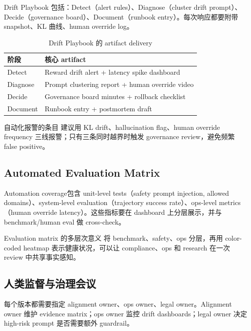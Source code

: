 \documentclass[a4paper]{article}
\begin{document}
Drift Playbook 包括：Detect（alert rules）、Diagnose（cluster drift prompt）、Decide（governance board）、Document（runbook entry）。每次响应都要附带 snapshot、KL 曲线、human override log。

\begin{table}[H]
\centering
\begin{tabular}{p{} p{}}
\toprule
阶段 & 核心 artifact \\
\midrule
Detect & Reward drift alert + latency spike dashboard \\
Diagnose & Prompt clustering report + human override video \\
Decide & Governance board minutes + rollback checklist \\
Document & Runbook entry + postmortem draft \\
\bottomrule
\end{tabular}
\caption{Drift Playbook 的 artifact delivery}
\end{table}

\begin{knowledgebox}{自动化报警的条目}
建议用 KL drift、hallucination flag、human override frequency 三线报警；只有三条同时越界时触发 governance review，避免频繁 false positive。
\end{knowledgebox}

\subsection{Automated Evaluation Matrix}

Automation coverage包含 unit-level tests（safety prompt injection, allowed domains）、system-level evaluation（trajectory success rate）、ops-level metrics（human override latency）。这些指标要在 dashboard 上分层展示，并与 benchmark/human eval 做 cross-check。

\begin{importantbox}{Evaluation matrix 的多层次意义}
将 benchmark、safety、ops 分层，再用 color-coded heatmap 表示健康状况，可以让 compliance、ops 和 research 在一次 review 中共享事实感知。
\end{importantbox}

\subsection{人类监督与治理会议}

每个版本都需要指定 alignment owner、ops owner、legal owner。Alignment owner 维护 evidence matrix；ops owner 监控 drift dashboards；legal owner 决定 high-risk prompt 是否需要额外 guardrail。
\end{document}
